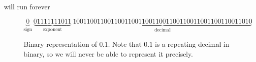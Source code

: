 \documentclass[justified, nobib]{tufte-handout}
\newcommand{\matplotlibGalleryLink}{http://matplotlib.org/gallery.html}
\newcommand{\matplotlibGalleryNote}{\footnote{You will need the syntax for
      matplotlib. You can find everything with the help commands, or can get
      syntax and ideas from \href{\matplotlibGalleryLink}{example plots} that
      others have made.}}
\begin{document}
\noindent
will run forever

\begin{centering}
\begin{figure*}
$$\underbrace{0}_{\text{sign}} \: \underbrace{01111111011}_{\text{exponent}} \: \underbrace{1001100110011001100110011001100110011001100110011010}_{\text{decimal}}$$
\caption{Binary representation of $0.1$. Note that $0.1$ is a repeating decimal in binary, so we will never be able to represent it precisely.}
\end{figure*}
\end{centering}





\end{document}
